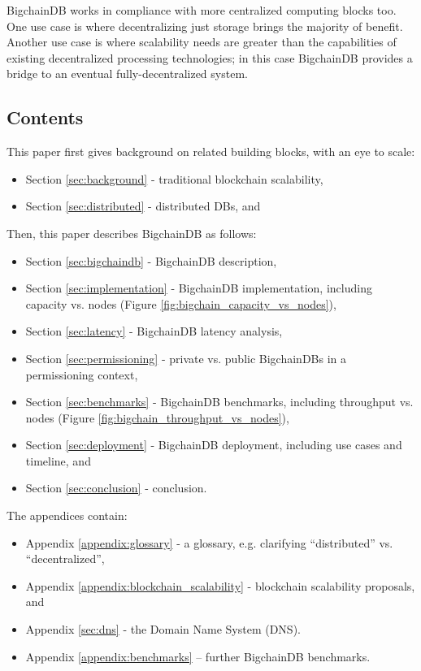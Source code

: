 BigchainDB works in compliance with more centralized computing blocks too.
One use case is where decentralizing just storage brings the majority of benefit.
Another use case is where scalability needs are greater than the capabilities of existing decentralized processing technologies; in this case BigchainDB provides a bridge to an eventual fully-decentralized system.

\subsection{Contents}

This paper first gives background on related building blocks, with an eye to scale:
\begin{itemize}
 \item Section \ref{sec:background} - traditional blockchain scalability,
 \item Section \ref{sec:distributed} - distributed DBs, and
\end{itemize}


Then, this paper describes BigchainDB as follows:
\begin{itemize}
 \item Section \ref{sec:bigchaindb} - BigchainDB description,
 \item Section \ref{sec:implementation} - BigchainDB implementation, including capacity vs. nodes (Figure \ref{fig:bigchain_capacity_vs_nodes}),
 \item Section \ref{sec:latency} - BigchainDB latency analysis,
 \item Section \ref{sec:permissioning} - private vs. public BigchainDBs in a permissioning context,
 \item Section \ref{sec:benchmarks} - BigchainDB benchmarks, including throughput vs. nodes (Figure \ref{fig:bigchain_throughput_vs_nodes}),
 \item Section \ref{sec:deployment} - BigchainDB deployment, including use cases and timeline, and
 \item Section \ref{sec:conclusion} - conclusion.
\end{itemize}


The appendices contain:
\begin{itemize}
 \item Appendix \ref{appendix:glossary} - a glossary, e.g. clarifying “distributed” vs. “decentralized”,
 \item Appendix \ref{appendix:blockchain_scalability} - blockchain scalability proposals, and
 \item Appendix \ref{sec:dns} - the Domain Name System (DNS).
 \item Appendix \ref{appendix:benchmarks} – further BigchainDB benchmarks.
\end{itemize}